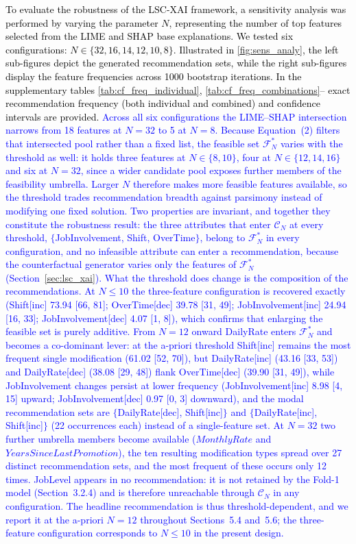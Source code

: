 \documentclass[a4paper,fleqn]{cas-sc}
\begin{document}
\textcolor{black}{To evaluate the robustness of the LSC-XAI framework, a sensitivity analysis was performed by varying the parameter $N$, representing the number of top features selected from the LIME and SHAP base explanations. We tested six configurations: $N \in \{32, 16, 14, 12, 10, 8\}$. Illustrated in \cref{fig:sens_analy}, the left sub-figures depict the generated recommendation sets, while the right sub-figures display the feature frequencies across 1000 bootstrap iterations. \textcolor{black}{In the supplementary tables \ref{tab:cf_freq_individual}, \ref{tab:cf_freq_combinations}-- exact recommendation frequency (both individual and combined) and confidence intervals are provided.}  \textcolor{blue}{Across all six configurations the LIME--SHAP intersection narrows from 18 features at $N = 32$ to 5 at $N = 8$. Because Equation~(2) filters that intersected pool rather than a fixed list, the feasible set $\mathcal{F}^*_N$ varies with the threshold as well: it holds three features at $N \in \{8, 10\}$, four at $N \in \{12, 14, 16\}$ and six at $N = 32$, since a wider candidate pool exposes further members of the feasibility umbrella. Larger $N$ therefore makes more feasible features available, so the threshold trades recommendation breadth against parsimony instead of modifying one fixed solution. Two properties are invariant, and together they constitute the robustness result: the three attributes that enter $\mathcal{C}_N$ at every threshold, $\{$JobInvolvement, Shift, OverTime$\}$, belong to $\mathcal{F}^*_N$ in every configuration, and no infeasible attribute can enter a recommendation, because the counterfactual generator varies only the features of $\mathcal{F}^*_N$ (Section~\ref{sec:lsc_xai}). What the threshold does change is the composition of the recommendations. At $N \le 10$ the three-feature configuration is recovered exactly (Shift[inc] 73.94 [66, 81]; OverTime[dec] 39.78 [31, 49]; JobInvolvement[inc] 24.94 [16, 33]; JobInvolvement[dec] 4.07 [1, 8]), which confirms that enlarging the feasible set is purely additive. From $N = 12$ onward DailyRate enters $\mathcal{F}^*_N$ and becomes a co-dominant lever: at the a-priori threshold Shift[inc] remains the most frequent single modification (61.02 [52, 70]), but DailyRate[inc] (43.16 [33, 53]) and DailyRate[dec] (38.08 [29, 48]) flank OverTime[dec] (39.90 [31, 49]), \textcolor{blue}{while JobInvolvement changes persist at lower frequency (JobInvolvement[inc] 8.98 [4, 15] upward; JobInvolvement[dec] 0.97 [0, 3] downward)}, and the modal recommendation sets are $\{$DailyRate[dec], Shift[inc]$\}$ and $\{$DailyRate[inc], Shift[inc]$\}$ (22 occurrences each) instead of a single-feature set. At $N = 32$ two further umbrella members become available ($MonthlyRate$ and $YearsSinceLastPromotion$), the ten resulting modification types spread over 27 distinct recommendation sets, and the most frequent of these occurs only 12 times. JobLevel appears in no recommendation: it is not retained by the Fold-1 model (Section~3.2.4) and is therefore unreachable through $\mathcal{C}_N$ in any configuration. The headline recommendation is thus threshold-dependent, and we report it at the a-priori $N = 12$ throughout Sections~5.4 and~5.6; the three-feature configuration corresponds to $N \le 10$ in the present design. }}
\end{document}

